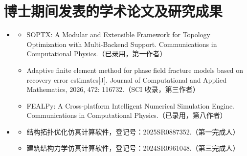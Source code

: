 
\chapter*{博士期间发表的学术论文及研究成果}
\begin{itemize}
\item[1.] {}
    \begin{itemize}
	    \setlength{\leftmargin}{1.5em}  %
	    \setlength{\itemindent}{-1em}   %
	    \item [{[1]}]
	    	SOPTX: A Modular and Extensible Framework for Topology Optimization with Multi-Backend Support. Communications in Computational Physics.（已录用，第一作者）
	
	    \item [{[2]}]
	    	Adaptive finite element method for phase field fracture models based on recovery error estimates[J]. Journal of Computational and Applied Mathematics, 2026, 472: 116732.（SCI 收录，第三作者）
	
	    \item [{[3]}]
	    	FEALPy: A Cross-platform Intelligent Numerical Simulation Engine. Communications in Computational Physics.（已录用，第八作者）
	    \end{itemize}
	    
\item[2.] {}
    \begin{itemize}
		\setlength{\leftmargin}{1.5em}  %
		\setlength{\itemindent}{-1em}   %
		\item [{[1]}]
		结构拓扑优化仿真计算软件，登记号：2025SR0887352.（第一完成人）
		
		\item [{[2]}]
		建筑结构力学仿真计算软件，登记号：2024SR0961048.（第三完成人）
		
	\end{itemize}
\end{itemize}